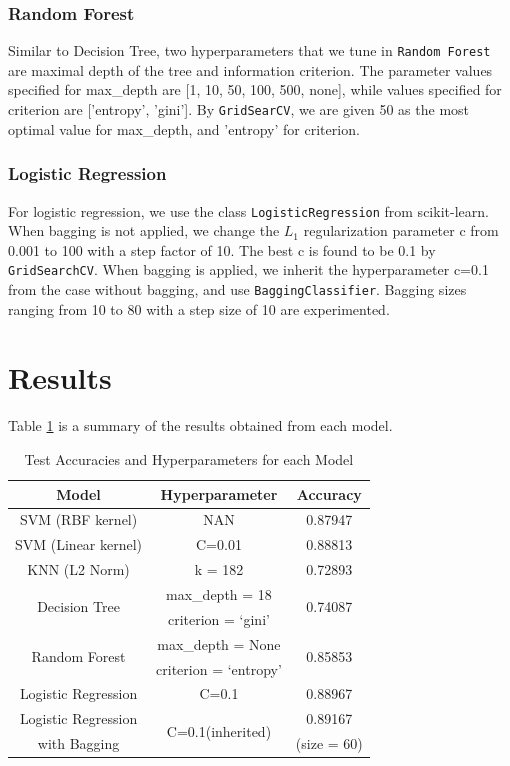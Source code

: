 \documentclass[10pt,twocolumn]{article}
\begin{document}
	\subsubsection{Random Forest}
	Similar to Decision Tree, two hyperparameters that we tune in \texttt{Random Forest} are maximal depth of the tree and information criterion. The parameter values specified for max\_depth are [1, 10, 50, 100, 500, none], while values specified for criterion are ['entropy', 'gini']. By \texttt{GridSearCV}, we are given 50 as the most optimal value for max\_depth, and 'entropy' for criterion. 
	\subsubsection{Logistic Regression}
	For logistic regression, we use the class \texttt{LogisticRegression} from scikit-learn. When bagging is not applied, we change the $L_1$ regularization parameter c from 0.001 to 100 with a step factor of 10. The best c is found to be 0.1 by \texttt{GridSearchCV}. When bagging is applied, we inherit the hyperparameter c=0.1 from the case without bagging, and use \texttt{BaggingClassifier}. Bagging sizes ranging from 10 to 80 with a step size of 10 are experimented.  
	\section{Results}
	Table \ref{results} is a summary of the results obtained from each model. 
	\begin{table}[H]
		\begin{tabular}{|c|c|c|}
			\hline
			Model & Hyperparameter & Accuracy\\
			\hline 
			\hline
			SVM (RBF kernel) & NAN & 0.87947\\
			\hline
			SVM (Linear kernel) & C=0.01 & 0.88813\\
			\hline
			KNN (L2 Norm) & k = 182 & 0.72893\\
			\hline
			\multirow{2}{*}{Decision Tree}  & \small{max\_depth = 18} & \multirow{2}{*}{0.74087}\\
			& \small{criterion = ‘gini’} & \\
			\hline
			\multirow{2}{*}{Random Forest} & \small{max\_depth = None} & \multirow{2}{*}{0.85853}\\
			& \small{criterion = ‘entropy’}& \\
			\hline
			Logistic Regression & C=0.1 & 0.88967\\
			\hline
			Logistic Regression & \multirow{2}{*}{C=0.1(inherited)} & 0.89167 \\
			with Bagging & & (size = 60)\\
			\hline		
		\end{tabular}
		\caption{Test Accuracies and Hyperparameters for each Model}\label{results}
	\end{table}
\end{document}
